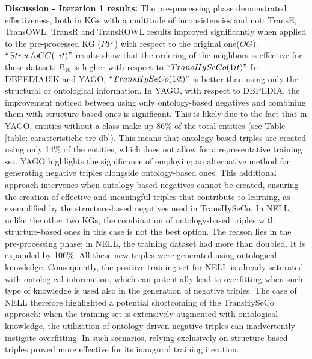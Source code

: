 \documentclass[sigconf]{acmart}
\newcommand{\TransHI}{TransHySeCo\xspace}
\begin{document}
\noindent\textbf{Discussion - Iteration 1 results:} 
The pre-processing phase demonstrated effectiveness, both in KGs with a multitude of inconsistencies and not: TransE, TransOWL, TransR and TransROWL results improved significantly when applied to the pre-processed KG ($PP$ ) with respect to the original one($OG$).
$``Str. w/o CC (1 it)"$ results show that the ordering of the neighbors is effective for these dataset: $R_{10}$ is higher with respect to $``\TransHI (1 it)"$
In DBPEDIA15K and YAGO, $``\TransHI (1 it)"$ is better than using only the structural or ontological information. In YAGO, with respect to DBPEDIA, the improvement noticed between using only ontology-based negatives and combining them with structure-based ones is significant. This is likely due to the fact that in YAGO, entities without a class make up 86\% of the total entities (see Table \ref{table: caratteristiche tre db}). This means that ontology-based triples are created using only 14\% of the entities, which does not allow for a representative training set. YAGO highlights the significance of employing an alternative method for generating negative triples alongside ontology-based ones. This additional approach intervenes when ontology-based negatives cannot be created, ensuring the creation of effective and meaningful triples that contribute to learning, as exemplified by the structure-based negatives used in \TransHI.
In NELL, unlike the other two KGs, the combination of ontology-based triples with structure-based ones in this case is not the best option. The reason  lies in the pre-processing phase; in NELL, the training dataset had more than doubled. It is expanded by 106\%. All these new triples were generated using ontological knowledge. Consequently, the positive training set for NELL is already saturated with ontological information, which can potentially lead to overfitting when such type of knowledge is used also in the generation of negative triples.
The case of NELL therefore highlighted a potential shortcoming of the \TransHI approach: when the training set is extensively augmented with ontological knowledge, the utilization of ontology-driven negative triples can inadvertently instigate overfitting. In such scenarios, relying exclusively on structure-based triples proved more effective for its inaugural training iteration.
\end{document}
